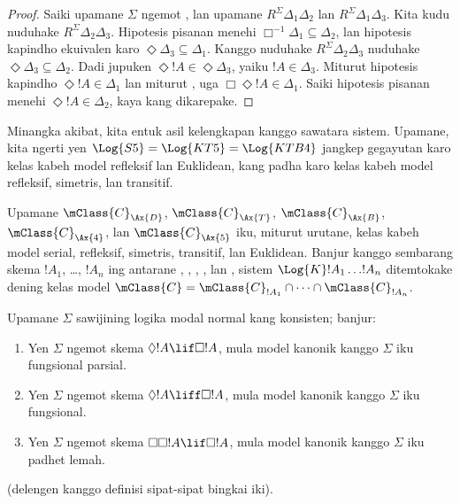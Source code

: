 \documentclass[../../../include/open-logic-section]{subfiles}
\begin{document}
\begin{proof}
  Saiki upamane $\Sigma$ ngemot , lan upamane $R^\Sigma
  \Delta_1\Delta_2$ lan $R^\Sigma \Delta_1\Delta_3$. Kita kudu nuduhake
  $R^\Sigma \Delta_2\Delta_3$. Hipotesis pisanan menehi
  $\Box^{-1}\Delta_1 \subseteq \Delta_2$, lan hipotesis kapindho ekuivalen
  karo $\Diamond\Delta_3 \subseteq \Delta_1$. Kanggo nuduhake $R^\Sigma
  \Delta_2\Delta_3$
  nuduhake $\Diamond\Delta_3 \subseteq \Delta_2$. Dadi jupuken
  $\Diamond!A \in \Diamond\Delta_3$, yaiku $!A \in \Delta_3$. Miturut
  hipotesis kapindho $\Diamond!A \in \Delta_1$ lan miturut , uga
  $\Box\Diamond!A \in \Delta_1$. Saiki hipotesis pisanan menehi
  $\Diamond!A \in \Delta_2$, kaya kang dikarepake.
  \end{proof}

Minangka akibat, kita entuk asil kelengkapan kanggo sawatara sistem.
Upamane, kita ngerti yen $\Log{S5} = \Log{KT5} =
\Log{KTB4}$ jangkep gegayutan karo kelas kabeh model refleksif lan
Euklidean, kang padha karo kelas kabeh model refleksif, simetris, lan
transitif.

\begin{thm}
  Upamane $\mClass{C}_\Ax{D}$, $\mClass{C}_\Ax{T}$,
  $\mClass{C}_\Ax{B}$, $\mClass{C}_\Ax{4}$, lan
  $\mClass{C}_\Ax{5}$ iku, miturut urutane, kelas kabeh model serial,
  refleksif, simetris, transitif, lan Euklidean. Banjur kanggo sembarang
  skema $!A_1$, \dots, $!A_n$ ing antarane ,
  , , , lan , sistem
  $\Log{K}!A_1 \dots !A_n$ ditemtokake dening
  kelas model $\mClass{C} = \mClass{C}_{!A_1} \cap \dots
  \cap \mClass{C}_{!A_n}$.
\end{thm}

\begin{prop}
  Upamane $\Sigma$ sawijining logika modal normal kang konsisten; banjur:
  \begin{enumerate}
  \item{}%
    Yen $\Sigma$ ngemot skema $\Diamond!A \lif \Box
    !A$, mula model kanonik kanggo $\Sigma$ iku fungsional parsial.
  \item Yen $\Sigma$ ngemot skema $\Diamond!A \liff \Box
    !A$, mula model kanonik kanggo $\Sigma$ iku fungsional.
  \item Yen $\Sigma$ ngemot skema $\Box\Box!A \lif \Box
    !A$, mula model kanonik kanggo $\Sigma$ iku padhet lemah.
  \end{enumerate}
(delengen  kanggo definisi sipat-sipat
  bingkai iki).
\end{prop}
\end{document}
